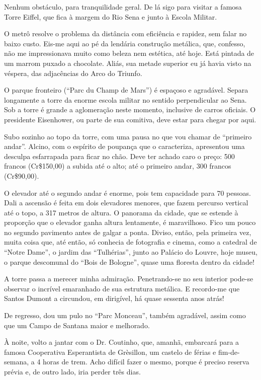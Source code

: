 Nenhum obstáculo, para tranquilidade geral. De lá sigo para visitar a famosa Torre Eiffel, que fica à margem do Rio Sena e junto à Escola Militar.

O metrô resolve o problema da distância com eficiência e rapidez, sem falar no baixo custo. Eis-me aqui ao pé da lendária construção metálica, que, confesso, não me impressionava muito como beleza nem estética, até hoje. Está pintada de um marrom puxado a chocolate. Aliás, sua metade superior eu já havia visto na véspera, das adjacências do Arco do Triunfo.

O parque fronteiro (``Parc du Champ de Mars'') é espaçoso e agradável. Separa longamente a torre da enorme escola militar no sentido perpendicular ao Sena. Sob a torre é grande a aglomeração neste momento, inclusive de carros oficiais. O presidente Eisenhower, ou parte de sua comitiva, deve estar para chegar por aqui.

Subo sozinho ao topo da torre, com uma pausa no que vou chamar de ``primeiro andar''. Alcino, com o espírito de poupança que o caracteriza, apresentou uma desculpa esfarrapada para ficar no chão. Deve ter achado caro o preço: 500 francos (Cr\$150,00) a subida até o alto; até o primeiro andar, 300 francos (Cr\$90,00).

O elevador até o segundo andar é enorme, pois tem capacidade para 70 pessoas. Dali a ascensão é feita em dois elevadores menores, que fazem percurso vertical até o topo, a 317 metros de altura. O panorama da cidade, que se estende à proporção que o elevador ganha altura lentamente, é maravilhoso. Fico um pouco no segundo pavimento antes de galgar a ponta. Diviso, então, pela primeira vez, muita coisa que, até então, só conhecia de fotografia e cinema, como a catedral de ``Notre Dame'', o jardim das ``Tulhérias'', junto ao Palácio do Louvre, hoje museu, o parque descomunal do ``Bois de Bologne'', quase uma floresta dentro da cidade!

A torre passa a merecer minha admiração. Penetrando-se no seu interior pode-se observar o incrível emaranhado de sua estrutura metálica. E recordo-me que Santos Dumont a circundou, em dirigível, há quase sessenta anos atrás!

De regresso, dou um pulo no ``Parc Monceau'', também agradável, assim como que um Campo de Santana maior e melhorado.

À noite, volto a jantar com o Dr. Coutinho, que, amanhã, embarcará para a famosa Cooperativa Esperantista de Grèsillon, um castelo de férias e fim-de-semana, a 4 horas de trem. Acho difícil fazer o mesmo, porque é preciso reserva prévia e, de outro lado, iria perder três dias.

